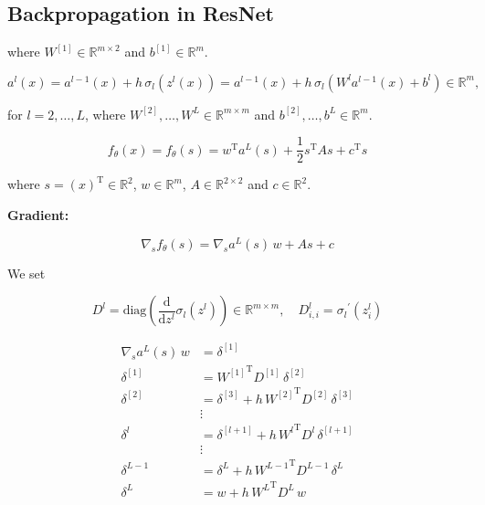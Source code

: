 \subsection{Backpropagation in ResNet}



where $W^{[1]} \in \mathbb{R}^{m \times 2}$ and $b^{[1]} \in \mathbb{R}^{m}$.

\begin{equation*}
    a^{l}(x) = a^{l-1}(x) + h \, \sigma_{l} (z^{l}(x)) = a^{l-1}(x) + h \, \sigma_{l} (W^{l} a^{l-1}(x) + b^{l}) \in \mathbb{R}^{m}, 
\end{equation*}

for $l = 2, \ldots, L$, where $W^{[2]}, \ldots, W^{L} \in \mathbb{R}^{m \times m}$ and $b^{[2]}, \ldots, b^{L} \in \mathbb{R}^{m}$.

\begin{equation*}
    f_{\theta}(x) = f_{\theta}(s) = w^{\mathrm{T}} a^{L}(s) + \frac{1}{2} s^{\mathrm{T}} A s + c^{\mathrm{T}} s 
\end{equation*}

where $s = (x)^{\mathrm{T}} \in \mathbb{R}^{2}$, $w \in \mathbb{R}^{m}$, $A \in \mathbb{R}^{2 \times 2}$ and $c \in \mathbb{R}^2$.

\textbf{Gradient:}

\begin{equation*}
    \nabla_s f_{\theta}(s) = \nabla_s a^{L}(s) \, w + A s + c
\end{equation*}

We set

\begin{equation*}
    D^{l} = \mathrm{diag} \left( \frac{\mathrm{d}}{\mathrm{d}z^{l}} \sigma_{l} (z^{l}) \right) \in \mathbb{R}^{m \times m}, \quad D_{i, i}^{l} = {\sigma_{l}}^{\prime} (z_{i}^{l})
\end{equation*}

\begin{align*}
    \nabla_s a^{L}(s) \, w & = \delta^{[1]}  \\
    \delta^{[1]} & = {W^{[1]}}^{\mathrm{T}} D^{[1]} \, \delta^{[2]} \\
    \delta^{[2]} & = \delta^{[3]} + h \, {W^{[2]}}^{\mathrm{T}} D^{[2]} \, \delta^{[3]} \\
    &\vdots\\
    \delta^{l} & = \delta^{[l+1]} + h \, {W^{l}}^{\mathrm{T}} D^{l} \, \delta^{[l+1]} \\
    &\vdots\\
    \delta^{L-1} & = \delta^{L} + h \, {W^{L-1}}^{\mathrm{T}} D^{L-1} \, \delta^{L} \\
    \delta^{L} & = w + h \, {W^{L}}^{\mathrm{T}} D^{L} \, w
\end{align*}


